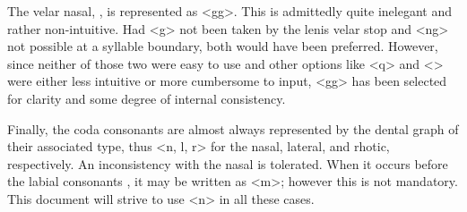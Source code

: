   The velar nasal, \phonemic{\engma}, is represented as <gg>. This is admittedly quite inelegant and rather non-intuitive. Had <g> not been taken by the lenis velar stop and <ng> not possible at a syllable boundary, both would have been preferred. However, since neither of those two were easy to use and other options like <q> and <> were either less intuitive or more cumbersome to input, <gg> has been selected for clarity and some degree of internal consistency.\par
  Finally, the coda consonants are almost always represented by the dental graph of their associated type, thus <n, l, r> for the nasal, lateral, and rhotic, respectively. An inconsistency with the nasal is tolerated. When it occurs before the labial consonants , it may be written as <m>; however this is not mandatory. This document will strive to use <n> in all these cases.\par
